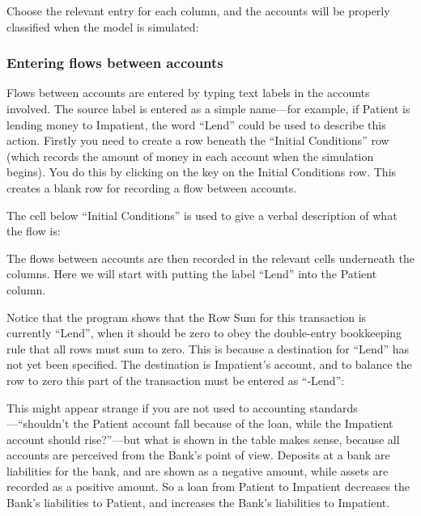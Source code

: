 \begin{center}
\end{center}

Choose the relevant entry for each column, and the accounts will be properly classified when the model is simulated:


\subsubsection{Entering flows between accounts}


Flows between accounts are entered by typing text labels in the
accounts involved. The source label is entered as a simple name---for
example, if Patient is lending money to Impatient, the word ``Lend''
could be used to describe this action. Firstly you need to create a
row beneath the ``Initial Conditions'' row (which records the amount of
money in each account when the simulation begins). You do this by
clicking on the  key on the Initial Conditions row. This creates a
blank row for recording a flow between accounts.


The cell below ``Initial Conditions'' is used to give a verbal
description of what the flow is: 


The flows between accounts are then recorded in the relevant cells
underneath the columns. Here we will start with putting the label
``Lend'' into the Patient column. 


Notice that the program shows that the Row Sum for this transaction is
currently ``Lend'', when it should be zero to obey the double-entry
bookkeeping rule that all rows must sum to zero. This is because a
destination for ``Lend'' has not yet been specified. The destination
is Impatient's account, and to balance the row to zero this part of
the transaction must be entered as ``-Lend'': 


This might appear strange if you are not used to accounting
standards---``shouldn't the Patient account fall because of the loan,
while the Impatient account should rise?''---but what is shown in the
table makes sense, because all accounts are perceived from the Bank's
point of view. Deposits at a bank are liabilities for the bank, and
are shown as a negative amount, while assets are recorded as a
positive amount. So a loan from Patient to Impatient decreases the
Bank's liabilities to Patient, and increases the Bank's liabilities to
Impatient. 

